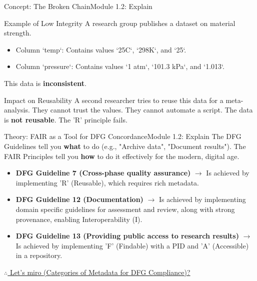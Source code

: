 \begin{frame}{Concept: The Broken Chain}{Module 1.2: Explain}
    \begin{block}{Example of Low Integrity}
        A research group publishes a dataset on material strength.
        \begin{itemize}
            \item Column `temp`: Contains values `25C`, `298K`, and `25`.
            \item Column `pressure`: Contains values `1 atm`, `101.3 kPa`, and `1.013`.
        \end{itemize}
        This data is \textbf{inconsistent}.
    \end{block}
    \pause
    \begin{block}{Impact on Reusability}
        A second researcher tries to reuse this data for a meta-analysis. They cannot trust the values. They cannot automate a script. The data is \textbf{not reusable}. The 'R' principle fails.
    \end{block}
\end{frame}

\begin{frame}{Theory: FAIR as a Tool for DFG Concordance}{Module 1.2: Explain}
    The DFG Guidelines tell you \textbf{what} to do (e.g., "Archive data", "Document results").
    \pause
    The FAIR Principles tell you \textbf{how} to do it effectively for the modern, digital age.
    
    \begin{itemize}
        \item \textbf{DFG Guideline 7 (Cross-phase quality assurance)} $\rightarrow$ Is achieved by implementing 'R' (Reusable), which requires rich metadata.
        \pause
        \item \textbf{DFG Guideline 12 (Documentation)} $\rightarrow$ Is achieved by implementing domain specific guidelines for assessment and review, along with strong provenance, enabling Interoperability (I).
        \pause
        \item \textbf{DFG Guideline 13 (Providing public access to research results)} $\rightarrow$ Is achieved by implementing 'F' (Findable) with a PID and 'A' (Accessible) in a repository.
    \end{itemize}
    \href{https://miro.com/app/board/uXjVJpI_9Kc=/?moveToWidget=3458764648818228865&cot=14}{$\therefore$ Let's miro (Categories of Metadata for DFG Compliance)?}    
\end{frame}

